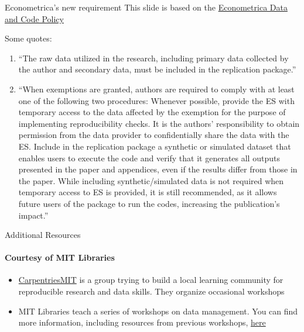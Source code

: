 \documentclass[10pt, aspectratio=169, xcolor=dvipsnames]{beamer}
\let\olditem\item
\renewcommand{\item}{%
\olditem\vspace{0.3em}}
\begin{document}
\begin{frame}[t]{Econometrica's new requirement}
    \footnotesize This slide is based on the \href{https://www.econometricsociety.org/publications/es-data-editor-website/data-and-code-availability-policy#:~:text=The\%20Econometric\%20Society\%20(ES)\%20and,access\%20to\%20the\%20data\%20and}{Econometrica Data and Code Policy}

    \normalsize\vspace{0.5em} Some quotes: 
    \begin{enumerate}
        \item ``The raw data utilized in the research, including primary data collected by the author and secondary data, must be included in the replication package.''
        \item ``When exemptions are granted, authors are required to comply with at least one of the following two procedures: Whenever possible, provide the ES with temporary access to the data affected by the exemption for the purpose of implementing reproducibility checks. It is the authors' responsibility to obtain permission from the data provider to confidentially share the data with the ES. Include in the replication package a synthetic or simulated dataset that enables users to execute the code and verify that it generates all outputs presented in the paper and appendices, even if the results differ from those in the paper. While including synthetic/simulated data is not required when temporary access to ES is provided, it is still recommended, as it allows future users of the package to run the codes, increasing the publication's impact.''
          \end{enumerate}
\end{frame}

\begin{frame}[t]{Additional Resources}
    \framesubtitle{Courtesy of MIT Libraries}

    \normalsize\vspace{0.5em} \begin{itemize}
        \item \href{https://docs.google.com/presentation/d/1UAtzDXer3DuLw-Wi9eAC8gwWY8XpMUAXViUCVcVupCU/edit?pli=1#slide=id.g1505c029de4_0_225}{CarpentriesMIT} is a group trying to build a local learning community for reproducible research and data skills.
              They organize occasional workshops
        \item MIT Libraries teach a series of workshops on data management. You can find more information, including resources from previous workshops, \href{https://libraries.mit.edu/data-management/services/workshops/}{here}
    \end{itemize}
\end{frame}
\end{document}
